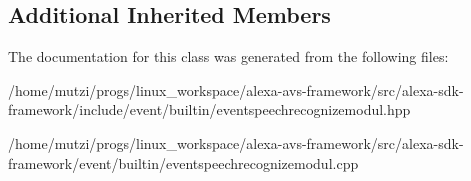 \subsection*{Additional Inherited Members}


The documentation for this class was generated from the following files\+:\begin{DoxyCompactItemize}
\item 
/home/mutzi/progs/linux\+\_\+workspace/alexa-\/avs-\/framework/src/alexa-\/sdk-\/framework/include/event/builtin/eventspeechrecognizemodul.\+hpp\item 
/home/mutzi/progs/linux\+\_\+workspace/alexa-\/avs-\/framework/src/alexa-\/sdk-\/framework/event/builtin/eventspeechrecognizemodul.\+cpp\end{DoxyCompactItemize}
